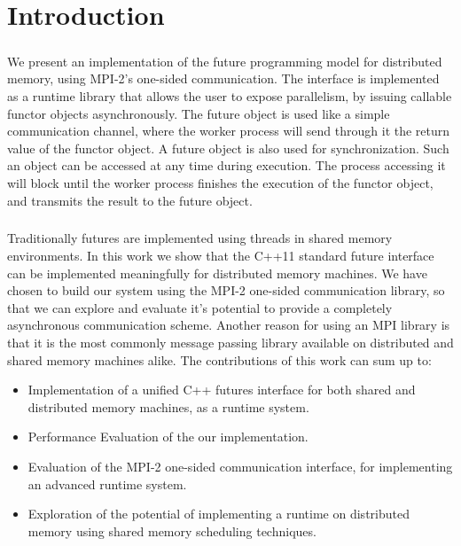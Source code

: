 \chapter*{Introduction}

\paragraph{}
We present an implementation of the future programming model for distributed memory,
using MPI-2's one-sided communication.  The interface is implemented as a runtime 
library that allows the user to  expose parallelism, by issuing callable functor objects 
asynchronously.  The future object is used like a simple communication channel, where the worker process 
will send through it the return value of the functor object. 
A future object is also used for synchronization. Such an object can be accessed at any time during execution.
The process accessing it will block until the worker process finishes the execution of the functor object, and
transmits the result to the future object.

\paragraph{}
Traditionally futures are implemented using threads in shared memory environments.  
In this work we show that the C++11 standard future interface~\cite{CPP:Threads} can be implemented meaningfully 
for distributed memory machines.  We have chosen to build our system using the MPI-2 one-sided
communication library, so that we can explore and evaluate it's potential to provide a completely asynchronous
communication scheme.  Another reason for using an MPI library is that it is the most commonly message passing
library available on distributed and shared memory machines alike.  
The contributions of this work can sum up to:
\\
\begin{itemize}
	\item Implementation of a unified C++ futures interface for both shared and distributed memory machines, as a runtime system.
	\item Performance Evaluation of the our implementation. 
	\item Evaluation of the MPI-2 one-sided communication interface, for implementing an advanced runtime system.
	\item Exploration of the potential of implementing a runtime on distributed memory using shared memory scheduling techniques.
\end{itemize}

